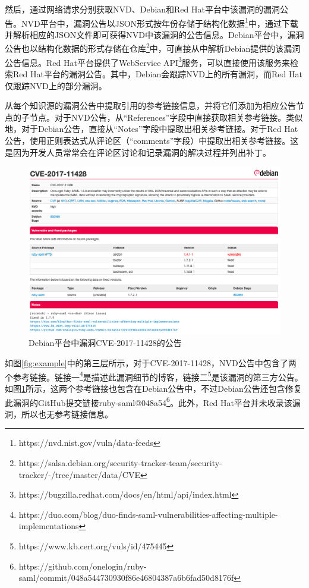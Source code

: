然后，\tool 通过网络请求分别获取NVD、Debian和Red Hat平台中该漏洞的漏洞公告。NVD平台中，漏洞公告以JSON形式按年份存储于结构化数据\footnote{https://nvd.nist.gov/vuln/data-feeds}中，\tool 通过下载并解析相应的JSON文件即可获得NVD中该漏洞的公告信息。Debian平台中，漏洞公告也以结构化数据的形式存储在仓库\footnote{https://salsa.debian.org/security-tracker-team/security-tracker/-/tree/master/data/CVE}中，\tool 可直接从中解析Debian提供的该漏洞公告信息。Red Hat平台提供了WebService API\footnote{https://bugzilla.redhat.com/docs/en/html/api/index.html}服务，\tool 可以直接使用该服务来检索Red Hat平台的漏洞公告。其中，Debian会跟踪NVD上的所有漏洞，而Red Hat仅跟踪NVD上的部分漏洞。

\tool 从每个知识源的漏洞公告中提取引用的参考链接信息，并将它们添加为相应公告节点的子节点。对于NVD公告，\tool 从“References”字段中直接获取相关参考链接。类似地，对于Debian公告，\tool 直接从“Notes”字段中提取出相关参考链接。对于Red Hat公告，\tool 使用正则表达式从评论区（“comments”字段）中提取出相关参考链接。这是因为开发人员常常会在评论区讨论和记录漏洞的解决过程并列出补丁。

\begin{figure}[!t]
    \centering
    \includegraphics[scale=0.345]{fig/debian-2017-11428}
    \caption{Debian平台中漏洞CVE-2017-11428的公告}\label{fig:debian-2017-11428}
\end{figure}

\begin{exmp}
如图\ref{fig:example}中的第三层所示，对于CVE-2017-11428，NVD公告中包含了两个参考链接。链接一\footnote{https://duo.com/blog/duo-finds-saml-vulnerabilities-affecting-multiple-implementations}是描述此漏洞细节的博客，链接二\footnote{https://www.kb.cert.org/vuls/id/475445}是该漏洞的第三方公告。如图\ref{fig:debian-2017-11428}所示，这两个参考链接也包含在Debian公告中，不过Debian公告还包含修复此漏洞的GitHub提交链接ruby-saml@048a54\footnote{https://github.com/onelogin/ruby-saml/commit/048a544730930f86e46804387a6b6fad50d8176f}。此外，Red Hat平台并未收录该漏洞，所以也无参考链接信息。
\end{exmp}

